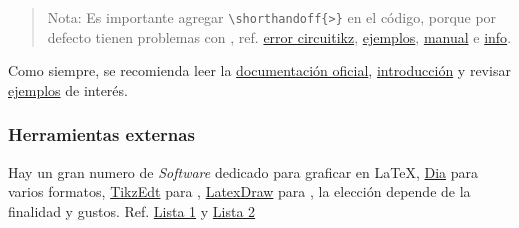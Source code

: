 \begin{quote}
	Nota: Es importante agregar \verb|\shorthandoff{>}| en el código, porque por defecto  tienen problemas con , ref. \href{http://tex.stackexchange.com/questions/105930/how-to-put-label-and-voltage-on-same-object-in-circuitikz/105996#105996}{error circuitikz},
	\href{http://www.texample.net/tikz/examples/tag/circuitikz/}{ejemplos}, \href{ctan.mackichan.com/graphics/pgf/contrib/circuitikz/circuitikzmanual.pdf}{manual} e \href{https://www.sharelatex.com/learn/CircuiTikz_package}{info}. 
\end{quote}

Como siempre, se recomienda leer la \href{http://www.texample.net/media/pgf/builds/pgfmanualCVS2012-11-04.pdf}{documentación oficial}, \href{http://en.wikibooks.org/wiki/LaTeX/PGF/TikZ}{introducción} y revisar \href{http://www.texample.net/tikz/examples/}{ejemplos} de interés.

\subsubsection{Herramientas externas}
Hay un gran numero de \textit{Software} dedicado para graficar en {\LaTeX}, \href{https://wiki.gnome.org/Apps/Dia}{Dia} para varios formatos, \href{http://www.tikzedt.org/}{TikzEdt} para ,  \href{http://latexdraw.sourceforge.net/}{LatexDraw} para , la elección depende de la finalidad y gustos. Ref. \href{http://tex.stackexchange.com/questions/26972/what-gui-applications-are-there-to-assist-in-generating-graphics-for-tex}{Lista 1} y \href{http://tex.stackexchange.com/questions/205/what-graphics-packages-are-there-for-creating-graphics-in-latex-documents}{Lista 2}

